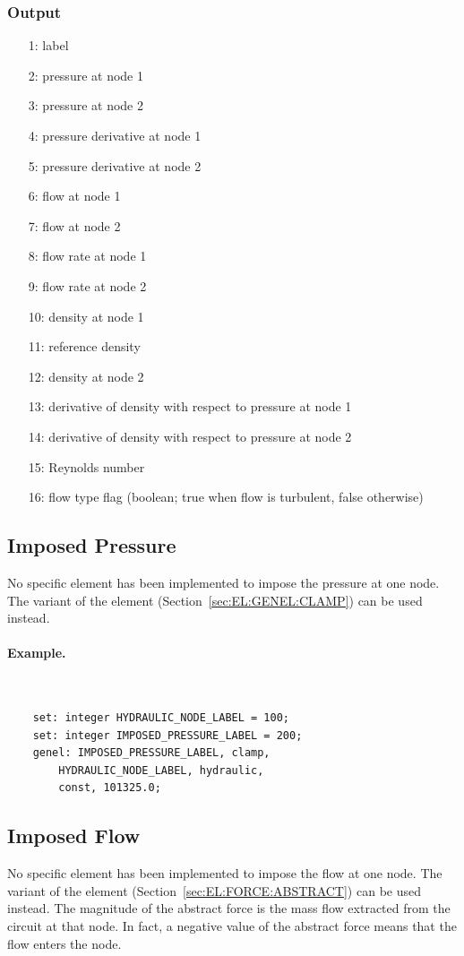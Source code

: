 \subsubsection{Output}
\begin{itemize}
\item[1:] label
\item[2:] pressure at node 1
\item[3:] pressure at node 2
\item[4:] pressure derivative at node 1
\item[5:] pressure derivative at node 2
\item[6:] flow at node 1
\item[7:] flow at node 2
\item[8:] flow rate at node 1
\item[9:] flow rate at node 2
\item[10:] density at node 1
\item[11:] reference density
\item[12:] density at node 2
\item[13:] derivative of density with respect to pressure at node 1
\item[14:] derivative of density with respect to pressure at node 2
\item[15:] Reynolds number
\item[16:] flow type flag (boolean; true when flow is turbulent, false otherwise)
\end{itemize}



\subsection{Imposed Pressure}
\label{sec:EL:HYDR:IMPOSED_PRESSURE}
No specific element has been implemented to impose the pressure at one node.
The  variant of the  element
(Section~\ref{sec:EL:GENEL:CLAMP}) can be used instead.

\paragraph{Example.} \
\begin{verbatim}
    set: integer HYDRAULIC_NODE_LABEL = 100;
    set: integer IMPOSED_PRESSURE_LABEL = 200;
    genel: IMPOSED_PRESSURE_LABEL, clamp,
        HYDRAULIC_NODE_LABEL, hydraulic,
        const, 101325.0;
\end{verbatim}


\subsection{Imposed Flow}
\label{sec:EL:HYDR:IMPOSED_FLOW}
No specific element has been implemented to impose the flow at one node.
The \kw{abstract} variant of the \kw{force} element
(Section~\ref{sec:EL:FORCE:ABSTRACT}) can be used instead.
The magnitude of the abstract force is the mass flow extracted
from the circuit at that node.
In fact, a negative value of the abstract force means that the flow enters
the node.

